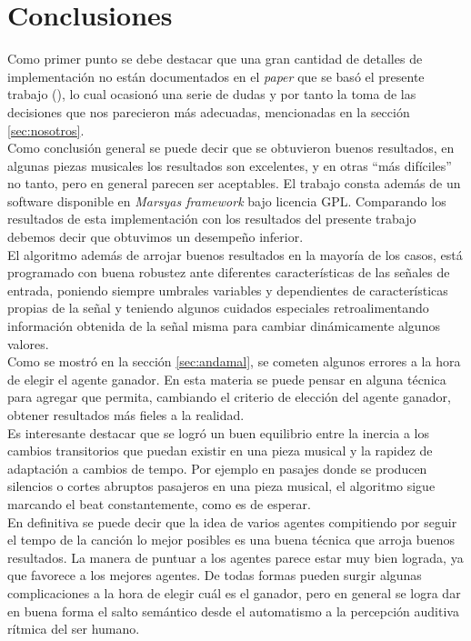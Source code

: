 \documentclass[12pt,a4paper,titlepage]{report}
\begin{document}
\chapter{Conclusiones}

Como primer punto se debe destacar que una gran cantidad de detalles de implementación no están documentados en el \emph{paper} que se basó el presente trabajo (\cite{bib:el_posta}), lo cual ocasionó una serie de dudas y  por tanto la toma de las decisiones que nos parecieron más adecuadas, mencionadas en la sección \ref{sec:nosotros}.\\

Como conclusión general se puede decir que se obtuvieron buenos resultados, en algunas piezas musicales los resultados son excelentes, y en otras ``más difíciles'' no tanto, pero en general parecen ser aceptables. El trabajo \cite{bib:el_posta} consta además de un software disponible en \emph{Marsyas framework} bajo licencia GPL. Comparando los resultados de esta implementación con los resultados del presente trabajo debemos decir que obtuvimos un desempeño inferior.\\

El algoritmo además de arrojar buenos resultados en la mayoría de los casos, está programado con buena robustez ante diferentes características de las señales de entrada, poniendo siempre umbrales variables y dependientes de características propias de la señal y teniendo algunos cuidados especiales retroalimentando información obtenida de la señal misma para cambiar dinámicamente algunos valores.\\

Como se mostró en la sección \ref{sec:andamal}, se cometen algunos errores a la hora de elegir el agente ganador. En esta materia se puede pensar en alguna técnica para agregar que permita, cambiando el criterio de elección del agente ganador, obtener resultados más fieles a la realidad.\\

Es interesante destacar que se logró un buen equilibrio entre la inercia a los cambios transitorios que puedan existir en una pieza musical y la rapidez de adaptación a cambios de tempo. Por ejemplo en pasajes donde se producen silencios o cortes abruptos pasajeros en una pieza musical, el algoritmo sigue marcando el beat constantemente, como es de esperar.\\

En definitiva se puede decir que la idea de varios agentes compitiendo por seguir el tempo de la canción lo mejor posibles es una buena técnica que arroja buenos resultados. La manera de puntuar a los agentes parece estar muy bien lograda, ya que favorece a los mejores agentes. De todas formas pueden surgir algunas complicaciones a la hora de elegir cuál es el ganador, pero en general se logra dar en buena forma el salto semántico desde el automatismo a la percepción auditiva rítmica del ser humano.
\end{document}
